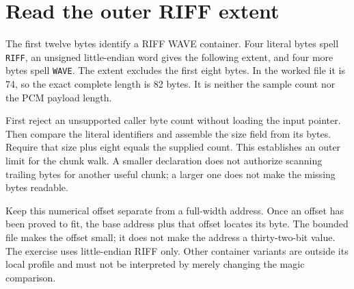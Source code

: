 \section{Read the outer RIFF extent}
The first twelve bytes identify a RIFF WAVE container. Four literal bytes spell
\texttt{RIFF}, an unsigned little-endian word gives the following extent, and four
more bytes spell \texttt{WAVE}. The extent excludes the first eight bytes. In the
worked file it is 74, so the exact complete length is 82 bytes. It is neither the
sample count nor the PCM payload length.

First reject an unsupported caller byte count without loading the input pointer.
Then compare the literal identifiers and assemble the size field from its bytes.
Require that size plus eight equals the supplied count. This establishes an outer
limit for the chunk walk. A smaller declaration does not authorize scanning trailing
bytes for another useful chunk; a larger one does not make the missing bytes readable.

Keep this numerical offset separate from a full-width address. Once an offset has
been proved to fit, the base address plus that offset locates its byte. The bounded
file makes the offset small; it does not make the address a thirty-two-bit value.
The exercise uses little-endian RIFF only. Other container variants are outside its
local profile and must not be interpreted by merely changing the magic comparison.
